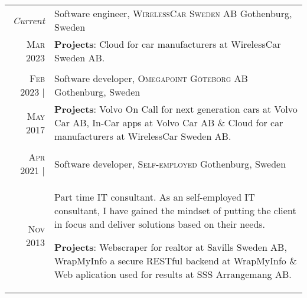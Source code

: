 \documentclass[a4paper,10pt]{scrartcl} %
\begin{document}
\begin{tabular}{r|p{15cm}}


\emph{Current}                      & Software engineer, \textsc{WirelessCar Sweden AB} \hfill Gothenburg, Sweden \\
\textsc{Mar 2023}                   & \footnotesize{
\textbf{Projects}: Cloud for car manufacturers at WirelessCar Sweden AB.} \\
\multicolumn{2}{c}{} \\


\textsc{Feb 2023} |                 & Software developer, \textsc{Omegapoint Göteborg AB} \hfill Gothenburg, Sweden \\
\phantom{ab} \textsc{May 2017}      & \footnotesize{
\textbf{Projects}: Volvo On Call for next generation cars at Volvo Car AB, In-Car apps at Volvo Car AB \& Cloud for car manufacturers at WirelessCar Sweden AB.} \\
\multicolumn{2}{c}{} \\


\textsc{Apr 2021} |  	            & Software developer, \textsc{Self-employed} \hfill Gothenburg, Sweden \\
\phantom{ab} \textsc{Nov 2013} 	    & \footnotesize{Part time IT consultant. As an self-employed IT consultant, I have gained the mindset of putting the client in focus and deliver solutions based on their needs.

\textbf{Projects}: Webscraper for realtor at Savills Sweden AB, WrapMyInfo a secure RESTful backend at WrapMyInfo \& Web aplication used for results at SSS Arrangemang AB.} \\

\end{tabular}

\end{document}

